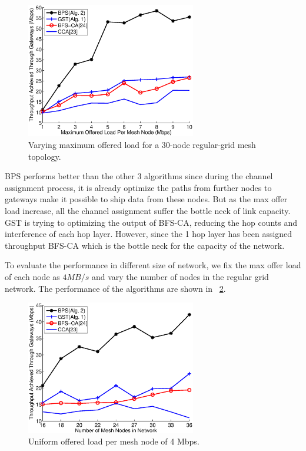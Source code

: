    \begin{figure}
   \centering
   \includegraphics[width=74mm]{figures/maxtpt}
   \vspace{-0.1in}
   \caption{Varying maximum offered load for a 30-node regular-grid mesh topology.}                                                                               
   \label{fig:maxtpt}
   \end{figure}
   BPS performs better than the other 3 algorithms since during the channel assignment process, it is already optimize the paths from further nodes to gateways make it possible to ship data from these nodes. But as the max offer load increase, all the channel assignment suffer the bottle neck of link capacity.
   GST is trying to optimizing the output of BFS-CA, reducing the hop counts and interference of each hop layer. However, since the 1 hop layer has been assigned throughput BFS-CA which is the bottle neck for the capacity of the network.



   To evaluate the performance in different size of network, we fix the max offer load of each node as $4MB/s$ and vary the number of nodes in the regular grid network. The performance of the algorithms are shown in ~\ref{fig:varysize}. 
   \begin{figure}
   \centering
   \includegraphics[width=74mm]{figures/varysize}
   \vspace{-0.1in}
   \caption{Uniform offered load per mesh node of 4 Mbps.}                                                                 
   \label{fig:varysize}
   \end{figure}

